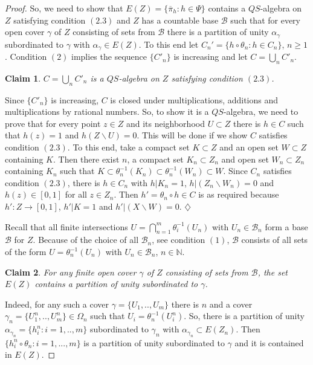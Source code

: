 \documentclass[12pt]{amsart}
\newtheorem{claim}{Claim}
\begin{document}
\begin{proof}
So, we need to show that $E(Z)=\{\overline\pi_h:h\in\Psi\}$ contains a $QS$-algebra on $Z$ satisfying condition $(2.3)$ and $Z$ has a countable base $\mathcal B$ such that for every open cover $\gamma$ of $Z$ consisting of sets from $\mathcal B$ there is a partition of unity $\alpha_\gamma$ subordinated to $\gamma$ with $\alpha_\gamma\in E(Z)$. To this end let 
$C_n'=\{h\circ\theta_n:h\in C_n\}$, $n\geq 1$. Condition $(2)$ implies
the sequence $\{C'_n\}$ is increasing and let $C=\bigcup_n C'_n$.  
\begin{claim}
$C=\bigcup_n C'_n$ is a $QS$-algebra on $Z$ satisfying condition $(2.3)$.
\end{claim}
Since $\{C'_n\}$ is increasing, $C$ is closed under multiplications, additions and multiplications by rational numbers. So, to show it is a $QS$-algebra, we 
need to prove that for every point $z\in Z$ and its neighborhood $U\subset Z$ there is $h\in C$ such that $h(z)=1$ and $h(Z\backslash U)=0$. This will be done if we show $C$ satisfies condition $(2.3)$. To this end, take a compact set $K\subset Z$ and an open set $W\subset Z$ containing $K$. Then there exist $n$, a compact set $K_n\subset Z_n$ and open set $W_n\subset Z_n$ containing $K_n$ such that $K\subset\theta_n^{-1}(K_n)\subset\theta_n^{-1}(W_n)\subset W$. Since $C_n$ satisfies condition $(2.3)$, there is $h\in C_n$
with $h|K_n=1$, $h|(Z_n\backslash W_n)=0$ and $h(z)\in [0,1]$ for all $z\in Z_n$. Then 
$h'=\theta_n\circ h\in C$ is as required because $h':Z\to [0,1]$, $h'|K=1$ and $h'|(X\backslash W)=0$.  $\diamondsuit$

Recall that all finite intersections $U=\bigcap_{n=1}^m\theta_i^{-1}(U_n)$ with $U_n\in\mathcal B_n$ form a base $\mathcal B$ for $Z$. Because of the choice of all $\mathcal B_n$, see condition $(1)$, $\mathcal B$ consists of all sets of the form $U=\theta_n^{-1}(U_n)$ with $U_n\in\mathcal B_n$, $n\in\mathbb N$. 
\begin{claim}
For any finite open cover $\gamma$ of $Z$ consisting of sets from $\mathcal B$, the set $E(Z)$ contains a partition of unity subordinated to $\gamma$. 
\end{claim}
Indeed, for any such a cover $\gamma=\{U_1,..,U_m\}$ there is $n$ and a cover $\gamma_n=\{U_1^n,..,U_m^n\}\in\Omega_n$ such that $U_i=\theta_n^{-1}(U_i^n)$. So, there is a partition of unity 
$\alpha_{\gamma_n}=\{h_i^n:i=1,..,m\}$ subordinated to $\gamma_n$ with $\alpha_{\gamma_n}\subset E(Z_n)$.  
Then $\{h^n_i\circ\theta_n:i=1,...,m\}$ is a partition of unity subordinated to $\gamma$ and it is contained in $E(Z)$.
\end{proof}
\end{document}
